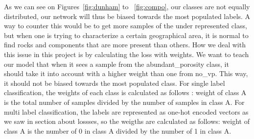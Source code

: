 As we can see on Figures~\ref{fig:dunham} to ~\ref{fig:compo}, our classes are not equally distributed, our network will thus be biased towards the most populated labels. A way to counter this would be to get more samples of the under represented class, but when one is trying to characterize a certain geographical area, it is normal to find rocks and components that are more present than others. How we deal with this issue in this project is by calculating the loss with weights. We want to teach our model that when it sees a sample from the abundant\_porosity class, it should take it into account with a higher weight than one from no\_vp. This way, it should not be biased towards the most populated class. 
For single label classification, the weights of each class is calculated as follows : weight of class A is the total number of samples divided by the number of samples in class A.
For multi label classification, the labels are represented as one-hot encoded vectors as we saw in section about lossses, so the weigths are calculated as follows: weight of class A is the number of 0 in class A divided by the number of 1 in class A.
